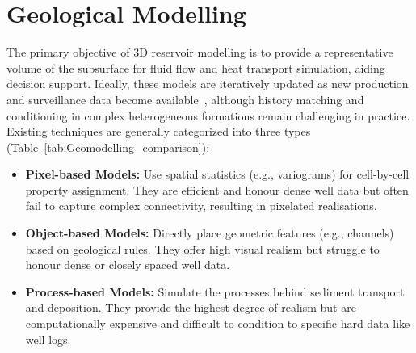 \section{Geological Modelling}\label{Sec:Geomodelling}
The primary objective of 3D reservoir modelling is to provide a representative volume of the subsurface for fluid flow and heat transport simulation, aiding decision support. Ideally, these models are iteratively updated as new production and surveillance data become available~\parencite{emerick2025ensemble, ringrose2016reservoir}, although history matching and conditioning in complex heterogeneous formations remain challenging in practice. 
Existing techniques are generally categorized into three types~\parencite{koltermann1996heterogeneity} (Table~\ref{tab:Geomodelling_comparison}):
\begin{itemize}
    \item \textbf{Pixel-based Models:} Use spatial statistics (e.g., variograms) for cell-by-cell property assignment. They are efficient and honour dense well data but often fail to capture complex connectivity, resulting in pixelated realisations.
    \item \textbf{Object-based Models:} Directly place geometric features (e.g., channels) based on geological rules. They offer high visual realism but struggle to honour dense or closely spaced well data.
    \item \textbf{Process-based Models:} Simulate the processes behind sediment transport and deposition. They provide the highest degree of realism but are computationally expensive and difficult to condition to specific hard data like well logs.
\end{itemize}

